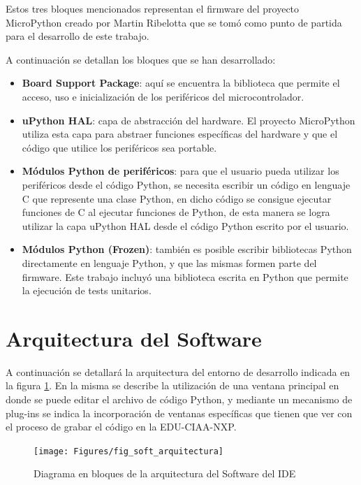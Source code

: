 Estos tres bloques mencionados representan el firmware del proyecto MicroPython creado por Martin Ribelotta que se tomó como punto de partida para el desarrollo de este trabajo. 

A continuación se detallan los bloques que se han desarrollado:

\begin{itemize}
	\item \textbf{Board Support Package}: aquí se encuentra la biblioteca que permite el acceso, uso e inicialización de los periféricos del microcontrolador.
	\item \textbf{uPython HAL}: capa de abstracción del hardware. El proyecto MicroPython utiliza esta capa para abstraer funciones específicas del hardware y que el código que utilice los periféricos sea portable.
	\item \textbf{Módulos Python de periféricos}: para que el usuario pueda utilizar los periféricos desde el código Python, se necesita escribir un código en lenguaje C que represente una clase Python, en dicho código se consigue ejecutar funciones de C al ejecutar funciones de Python, de esta manera se logra utilizar la capa uPython HAL desde el código Python escrito por el usuario.
	\item \textbf{Módulos Python (Frozen)}: también es posible escribir bibliotecas Python directamente en lenguaje Python, y que las mismas formen parte del firmware. Este trabajo incluyó una biblioteca escrita en Python que permite la ejecución de tests unitarios.
\end{itemize}


\section{Arquitectura del Software}
\label{sec:softwareArq}

A continuación se detallará la arquitectura del entorno de desarrollo indicada en la figura \ref{fig:softwareArq}. En la misma se describe la utilización de una ventana principal en donde se puede editar el archivo de código Python, y mediante un mecanismo de plug-ins se indica la incorporación de ventanas específicas que tienen que ver con el proceso de grabar el código en la EDU-CIAA-NXP. 

\begin{figure}[ht]
  \centering
    \texttt{[image: Figures/fig\_soft\_arquitectura]}
  \caption{Diagrama en bloques de la arquitectura del Software del IDE}
  \label{fig:softwareArq}
\end{figure}

